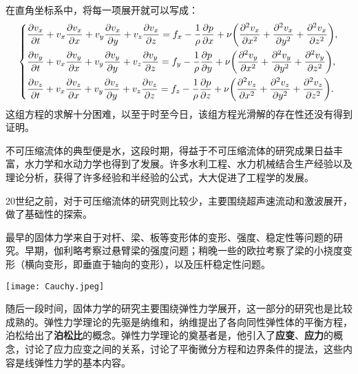 在直角坐标系中，将每一项展开就可以写成：
\[
    \begin{dcases}
        \dfrac{\partial v_x}{\partial t}+v_x\dfrac{\partial v_x}{\partial x}+v_y\dfrac{\partial v_x}{\partial y}+v_z\dfrac{\partial v_x}{\partial z}=f_x-\dfrac{1}{\rho}\dfrac{\partial p}{\partial x}+\nu\left(\dfrac{\partial^2 v_x}{\partial x^2}+\dfrac{\partial^2 v_x}{\partial y^2}+\dfrac{\partial^2 v_x}{\partial z^2}\right), \\
        \dfrac{\partial v_y}{\partial t}+v_x\dfrac{\partial v_y}{\partial x}+v_y\dfrac{\partial v_y}{\partial y}+v_z\dfrac{\partial v_y}{\partial z}=f_y-\dfrac{1}{\rho}\dfrac{\partial p}{\partial y}+\nu\left(\dfrac{\partial^2 v_y}{\partial x^2}+\dfrac{\partial^2 v_y}{\partial y^2}+\dfrac{\partial^2 v_y}{\partial z^2}\right), \\
        \dfrac{\partial v_z}{\partial t}+v_x\dfrac{\partial v_z}{\partial x}+v_y\dfrac{\partial v_z}{\partial y}+v_z\dfrac{\partial v_z}{\partial z}=f_z-\dfrac{1}{\rho}\dfrac{\partial p}{\partial z}+\nu\left(\dfrac{\partial^2 v_z}{\partial x^2}+\dfrac{\partial^2 v_z}{\partial y^2}+\dfrac{\partial^2 v_z}{\partial z^2}\right).
    \end{dcases}
\]
这组方程的求解十分困难，以至于时至今日，该组方程光滑解的存在性还没有得到证明。

不可压缩流体的典型便是水，这段时期，得益于不可压缩流体的研究成果日益丰富，水力学和水动力学也得到了发展。许多水利工程、水力机械结合生产经验以及理论分析，获得了许多经验和半经验的公式，大大促进了工程学的发展。

20世纪之前，对于可压缩流体的研究则比较少，主要围绕超声速流动和激波展开，做了基础性的探索。

最早的固体力学来自于对杆、梁、板等变形体的变形、强度、稳定性等问题的研究。早期，伽利略考察过悬臂梁的强度问题；稍晚一些的欧拉考察了梁的小挠度变形（横向变形，即垂直于轴向的变形），以及压杆稳定性问题。

\begin{marginparfigure}
    \texttt{[image: Cauchy.jpeg]}
\end{marginparfigure}


随后一段时间，固体力学的研究主要围绕弹性力学展开，这一部分的研究也是比较成熟的。弹性力学理论的先驱是纳维和，纳维提出了各向同性弹性体的平衡方程，泊松给出了\textbf{泊松比}的概念。弹性力学理论的奠基者是，他引入了\textbf{应变}、\textbf{应力}的概念，讨论了应力应变之间的关系，讨论了平衡微分方程和边界条件的提法，这些内容是线弹性力学的基本内容。

